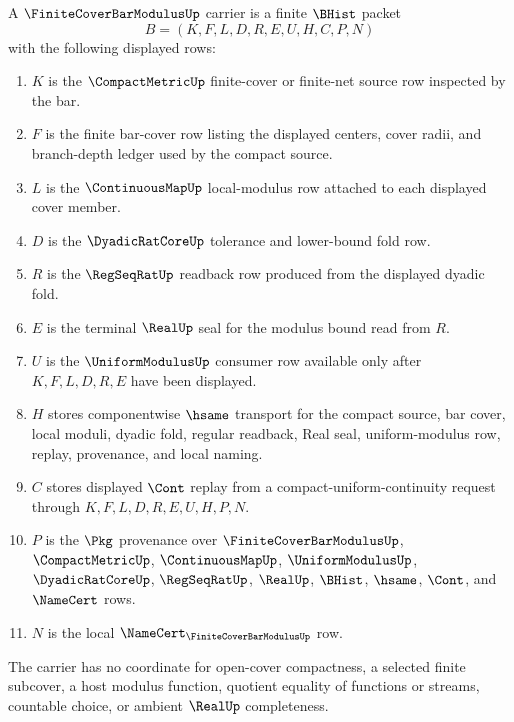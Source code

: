 \begin{definition}
\label{def:finite-cover-bar-modulus-carrier}
A $\FiniteCoverBarModulusUp$ carrier is a finite $\BHist$ packet
$$
B=(K,F,L,D,R,E,U,H,C,P,N)
$$
with the following displayed rows:
\begin{enumerate}
\item $K$ is the $\CompactMetricUp$ finite-cover or finite-net source row inspected by the bar.
\item $F$ is the finite bar-cover row listing the displayed centers, cover radii, and branch-depth ledger used by the compact source.
\item $L$ is the $\ContinuousMapUp$ local-modulus row attached to each displayed cover member.
\item $D$ is the $\DyadicRatCoreUp$ tolerance and lower-bound fold row.
\item $R$ is the $\RegSeqRatUp$ readback row produced from the displayed dyadic fold.
\item $E$ is the terminal $\RealUp$ seal for the modulus bound read from $R$.
\item $U$ is the $\UniformModulusUp$ consumer row available only after $K,F,L,D,R,E$ have been displayed.
\item $H$ stores componentwise $\hsame$ transport for the compact source, bar cover, local moduli, dyadic fold, regular readback, Real seal, uniform-modulus row, replay, provenance, and local naming.
\item $C$ stores displayed $\Cont$ replay from a compact-uniform-continuity request through $K,F,L,D,R,E,U,H,P,N$.
\item $P$ is the $\Pkg$ provenance over $\FiniteCoverBarModulusUp$, $\CompactMetricUp$, $\ContinuousMapUp$, $\UniformModulusUp$, $\DyadicRatCoreUp$, $\RegSeqRatUp$, $\RealUp$, $\BHist$, $\hsame$, $\Cont$, and $\NameCert$ rows.
\item $N$ is the local $\NameCert_{\FiniteCoverBarModulusUp}$ row.
\end{enumerate}
The carrier has no coordinate for open-cover compactness, a selected finite subcover, a host modulus function, quotient equality of functions or streams, countable choice, or ambient $\RealUp$ completeness.
\end{definition}

